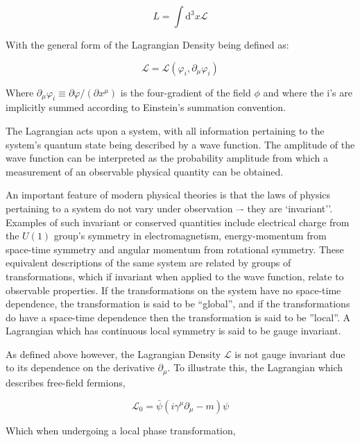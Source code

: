 \begin{equation}
L = \int \mathrm{d^{3}}x \mathcal{L}
\end{equation}

With the general form of the Lagrangian Density being defined as:

\begin{equation}
\mathcal{L} = \mathcal{L} ( \varphi_{i}, \partial _{\mu} \varphi_{i} )
\end{equation}

Where $\partial _{\mu}\varphi_{i} \equiv \partial \varphi / (\partial x^{\mu} )$ is the four-gradient of the field $\phi$ and where the i's are implicitly summed according to Einstein's summation convention\cite{ElectroweakStrong}.

The Lagrangian acts upon a system, with all information pertaining to the system's quantum state being described by a wave function. 
The amplitude of the wave function can be interpreted as the probability amplitude from which a measurement of an observable physical quantity can be obtained\cite{Isham}. 

An important feature of modern physical theories is that the laws of physics pertaining to a system do not vary under observation –- they are `invariant''. 
Examples of such invariant or conserved quantities include electrical charge from the $U(1)$ group’s symmetry in electromagnetism, energy-momentum from space-time symmetry and angular momentum from rotational symmetry\cite{Haywood}. 
These equivalent descriptions of the same system are related by groups of transformations, which if invariant when applied to the wave function, relate to observable properties\cite{QFT}. 
If the transformations on the system have no space-time dependence, the transformation is said to be ``global'', and if the transformations do have a space-time dependence then the transformation is said to be ''local''. 
A Lagrangian which has continuous local symmetry is said to be gauge invariant\cite{Haywood}. 

As defined above however, the Lagrangian Density $\mathcal{L}$ is not gauge invariant due to its dependence on the derivative $\partial _{\mu}$. To illustrate this, the Lagrangian which describes free-field fermions\cite{QFT}, 

\begin{equation}
\mathcal{L}_{0} = \bar{\psi}(i\gamma^{\mu}\partial_{\mu} - m)\psi
\end{equation}

Which when undergoing a local phase transformation,


